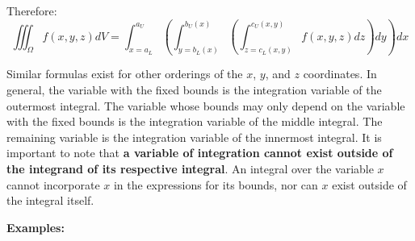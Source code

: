 \documentclass{article}
\begin{document}
Therefore:
\[\iiint_{\Omega} f(x,y,z)dV = \int_{x = a_L}^{a_U} \left(\int_{y = b_L(x)}^{b_U(x)} \left(\int_{z = c_L(x, y)}^{c_U(x, y)} f(x, y, z) dz \right) dy \right) dx\]

Similar formulas exist for other orderings of the \(x\), \(y\), and \(z\) coordinates. In general, the variable with the fixed bounds is the integration variable of the outermost integral. The variable whose bounds may only depend on the variable with the fixed bounds is the integration variable of the middle integral. The remaining variable is the integration variable of the innermost integral. It is important to note that {\bf a variable of integration cannot exist outside of the integrand of its respective integral}. An integral over the variable \(x\) cannot incorporate \(x\) in the expressions for its bounds, nor can \(x\) exist outside of the integral itself.

\vspace{5mm}

\textbf{Examples:}
\end{document}
